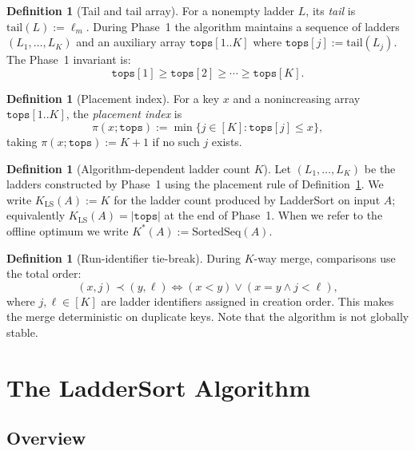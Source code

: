 \documentclass[12pt,a4paper]{article}
\theoremstyle{plain}
\theoremstyle{definition}
\newtheorem{definition}[theorem]{Definition}
\begin{document}
\begin{definition}[Tail and tail array]
\label{def:tail}
For a nonempty ladder $L$, its \emph{tail} is $\mathrm{tail}(L) := \ell_m$. During Phase~1 the algorithm maintains a sequence of ladders $(L_1,\ldots,L_K)$ and an auxiliary array $\mathtt{tops}[1..K]$ where $\mathtt{tops}[j] := \mathrm{tail}(L_j)$. The Phase~1 invariant is:
\[
  \mathtt{tops}[1] \geq \mathtt{tops}[2] \geq \cdots \geq \mathtt{tops}[K].
\]
\end{definition}
 
\begin{definition}[Placement index]
\label{def:placement}
For a key $x$ and a nonincreasing array $\mathtt{tops}[1..K]$, the \emph{placement index} is
\[
  \pi(x;\mathtt{tops}) := \min\bigl\{j \in [K] : \mathtt{tops}[j] \leq x\bigr\},
\]
taking $\pi(x;\mathtt{tops}) := K+1$ if no such $j$ exists.
\end{definition}
 
\begin{definition}[Algorithm-dependent ladder count $K$]
\label{def:K}
Let $(L_1,\ldots,L_K)$ be the ladders constructed by Phase~1 using the placement rule of Definition~\ref{def:placement}. We write $K_{\mathrm{LS}}(A) := K$ for the ladder count produced by LadderSort on input $A$; equivalently $K_{\mathrm{LS}}(A) = |\mathtt{tops}|$ at the end of Phase~1. When we refer to the offline optimum we write $K^*(A) := \mathrm{SortedSeq}(A)$.
\end{definition}
 
\begin{definition}[Run-identifier tie-break]
\label{def:tiebreak}
During $K$-way merge, comparisons use the total order:
\[
  (x,j) \prec (y,\ell) \iff (x < y) \vee (x = y \wedge j < \ell),
\]
where $j, \ell \in [K]$ are ladder identifiers assigned in creation order. This makes the merge deterministic on duplicate keys. Note that the algorithm is not globally stable.
\end{definition}
 
\section{The LadderSort Algorithm}
\label{sec:algorithm}

\subsection{Overview}
\end{document}
